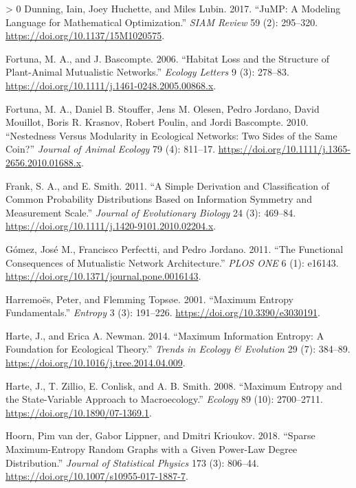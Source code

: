\documentclass[11pt]{article}
\newlength{\cslhangindent}
\newenvironment{CSLReferences}[3] %
 {%
  \setlength{\parindent}{0pt}
  \ifodd #1 \everypar{\setlength{\hangindent}{\cslhangindent}}\ignorespaces\fi
  \ifnum #2 > 0
  \setlength{\parskip}{#2\baselineskip}
  \fi
 }%
 {}
\begin{document}
\begin{CSLReferences}{1}{0}
\leavevmode\hypertarget{ref-Dunning2017JumMod}{}%
Dunning, Iain, Joey Huchette, and Miles Lubin. 2017. {``JuMP: A Modeling
Language for Mathematical Optimization.''} \emph{SIAM Review} 59 (2):
295--320. \url{https://doi.org/10.1137/15M1020575}.

\leavevmode\hypertarget{ref-Fortuna2006HabLos}{}%
Fortuna, M. A., and J. Bascompte. 2006. {``Habitat Loss and the
Structure of Plant-Animal Mutualistic Networks.''} \emph{Ecology
Letters} 9 (3): 278--83.
\url{https://doi.org/10.1111/j.1461-0248.2005.00868.x}.

\leavevmode\hypertarget{ref-Fortuna2010NesMod}{}%
Fortuna, M. A., Daniel B. Stouffer, Jens M. Olesen, Pedro Jordano, David
Mouillot, Boris R. Krasnov, Robert Poulin, and Jordi Bascompte. 2010.
{``Nestedness Versus Modularity in Ecological Networks: Two Sides of the
Same Coin?''} \emph{Journal of Animal Ecology} 79 (4): 811--17.
\url{https://doi.org/10.1111/j.1365-2656.2010.01688.x}.

\leavevmode\hypertarget{ref-Frank2011SimDera}{}%
Frank, S. A., and E. Smith. 2011. {``A Simple Derivation and
Classification of Common Probability Distributions Based on Information
Symmetry and Measurement Scale.''} \emph{Journal of Evolutionary
Biology} 24 (3): 469--84.
\url{https://doi.org/10.1111/j.1420-9101.2010.02204.x}.

\leavevmode\hypertarget{ref-Gomez2011FunConb}{}%
Gómez, José M., Francisco Perfectti, and Pedro Jordano. 2011. {``The
Functional Consequences of Mutualistic Network Architecture.''}
\emph{PLOS ONE} 6 (1): e16143.
\url{https://doi.org/10.1371/journal.pone.0016143}.

\leavevmode\hypertarget{ref-Harremoes2001MaxEnt}{}%
Harremoës, Peter, and Flemming Topsøe. 2001. {``Maximum Entropy
Fundamentals.''} \emph{Entropy} 3 (3): 191--226.
\url{https://doi.org/10.3390/e3030191}.

\leavevmode\hypertarget{ref-Harte2014MaxInf}{}%
Harte, J., and Erica A. Newman. 2014. {``Maximum Information Entropy: A
Foundation for Ecological Theory.''} \emph{Trends in Ecology \&
Evolution} 29 (7): 384--89.
\url{https://doi.org/10.1016/j.tree.2014.04.009}.

\leavevmode\hypertarget{ref-Harte2008MaxEnt}{}%
Harte, J., T. Zillio, E. Conlisk, and A. B. Smith. 2008. {``Maximum
Entropy and the State-Variable Approach to Macroecology.''}
\emph{Ecology} 89 (10): 2700--2711.
\url{https://doi.org/10.1890/07-1369.1}.

\leavevmode\hypertarget{ref-vanderHoorn2018SpaMaxa}{}%
Hoorn, Pim van der, Gabor Lippner, and Dmitri Krioukov. 2018. {``Sparse
Maximum-Entropy Random Graphs with a Given Power-Law Degree
Distribution.''} \emph{Journal of Statistical Physics} 173 (3): 806--44.
\url{https://doi.org/10.1007/s10955-017-1887-7}.


\end{CSLReferences}
\end{document}
